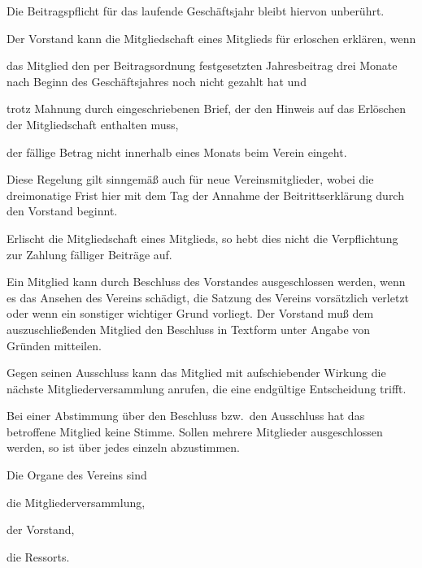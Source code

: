 \documentclass[draft]{scrartcl}
\begin{document}
\begin{contract}
Die Beitragspflicht für das laufende Geschäftsjahr bleibt hiervon unberührt.

Der Vorstand kann die Mitgliedschaft eines Mitglieds für erloschen erklären, wenn

\begin{compactitem}
  \item das Mitglied den per Beitragsordnung festgesetzten Jahresbeitrag
  drei Monate nach Beginn des Geschäftsjahres noch nicht gezahlt hat und
  \item trotz Mahnung durch eingeschriebenen Brief, der den Hinweis auf
  das Erlöschen der Mitgliedschaft enthalten muss,
  \item der fällige Betrag nicht innerhalb eines Monats beim Verein
  eingeht.
\end{compactitem}

Diese Regelung gilt sinngemäß auch für neue Vereinsmitglieder, wobei die
dreimonatige Frist hier mit dem Tag der Annahme der Beitrittserklärung
durch den Vorstand beginnt.

Erlischt die Mitgliedschaft eines Mitglieds, so hebt dies nicht die
Verpflichtung zur Zahlung fälliger Beiträge auf.


Ein Mitglied kann durch Beschluss des Vorstandes ausgeschlossen werden, wenn es
das Ansehen des Vereins schädigt, die Satzung des Vereins vorsätzlich
verletzt oder wenn ein sonstiger wichtiger Grund vorliegt. Der Vorstand muß
dem auszuschließenden Mitglied den Beschluss in Textform unter Angabe von Gründen
mitteilen.

Gegen seinen Ausschluss kann das Mitglied mit aufschiebender Wirkung die nächste
Mitgliederversammlung anrufen, die eine endgültige Entscheidung trifft.

Bei einer Abstimmung über den Beschluss bzw.\ den Ausschluss hat das betroffene
Mitglied keine Stimme. Sollen mehrere Mitglieder ausgeschlossen werden, so ist
über jedes einzeln abzustimmen.


Die Organe des Vereins sind

\begin{compactenum}[\hspace{2em}1.]
  \item die Mitgliederversammlung,
  \item der Vorstand,
  \item die Ressorts.
\end{compactenum}


\end{contract}
\end{document}
